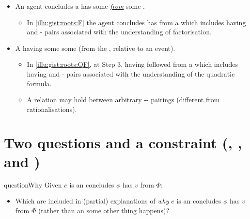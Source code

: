 \documentclass[10pt]{article}
\newcommand{\hand}{\ding{43}}
\begin{document}
\begin{note}
  \begin{itemize}
  \item
    An agent concludes a  has some  \underline{\emph{from}} some \pool{}.
    \begin{itemize}
    \item
      In \autoref{illu:gist:roots:F} the agent concludes \propI{\rootsCon{}} has \val{}  from a \pool{} which includes \propM{\rootsConEq{}} having   and - pairs associated with the \agents{} understanding of factorisation.
    \end{itemize}
  \item
    A  having some  \underline{\emph{\fof{}}} some \pool{} (from the \agpe{}, relative to an event).
    \begin{itemize}
    \item
      In \autoref{illu:gist:roots:QF}, at Step 3, \propI{\rootsCon{}} having \val{}  followed from a \pool{} which includes \propM{\rootsConEq{}} having   and - pairs associated with the \agents{} understanding of the quadratic formula.
    \end{itemize}
    \begin{itemize}
    \item[\hand]
      A \fof{} relation may hold between arbitrary -- pairings (different from rationalisations).
    \end{itemize}
  \end{itemize}
\end{note}


\section{Two questions and a constraint \hfill (\qWhy{}, \qHow{}, and \issueInclusion{})}
\label{sec:target}

\vfill

\begin{note}
  \begin{question}{questionWhy}{\qWhy{}}
    Given \(e\) is an  \vAgent{} concludes \prop{} \(\phi\) has \val{} \(v\) from \pool{} \(\Phi\):
    \begin{itemize}
    \item
      Which  are included in (partial) explanations of \emph{why} \(e\) is an  \vAgent{} concludes \prop{} \(\phi\) has \val{} \(v\) from \pool{} \(\Phi\) (rather than an  some other thing happens)?
    \end{itemize}
    \vspace{-1\baselineskip}
  \end{question}
\end{note}
\end{document}
